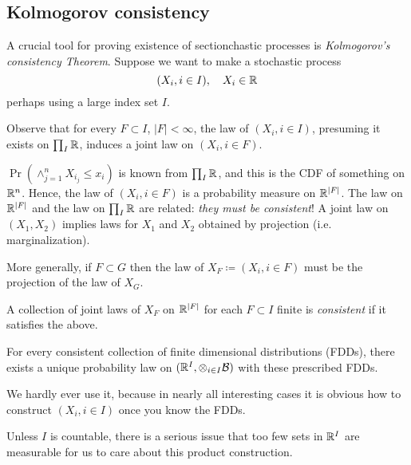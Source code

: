 
\subsection{Kolmogorov consistency}

A crucial tool for proving existence of sectionchastic processes is
\emph{Kolmogorov's consistency Theorem}.
Suppose we want to make a stochastic process
\[
  (X_i, i \in I), \quad X_i \in \mathbb{R}
\]
perhaps using a large index set $I$.

Observe that for every $F \subset I$, $\lvert F \rvert < \infty$,
the law of $(X_i, i \in I)$, presuming it exists on $\prod_{I} \mathbb{R}$,
induces a joint law on $(X_i, i \in F)$.

$\Pr(\land_{j=1}^n X_{i_j} \leq x_i)$ is known from $\prod_I \mathbb{R}$, and this
is the CDF of something on $\mathbb{R}^n$. Hence, the law of $(X_i, i \in F)$ is
a probability measure on $\mathbb{R}^{\lvert F \rvert}$.
The law on $\mathbb{R}^{\lvert F \rvert}$ and the law on $\prod_I \mathbb{R}$ are related:
\emph{they must be consistent}! A joint law on $(X_1, X_2)$ implies
laws for $X_1$ and $X_2$ obtained by projection (i.e. marginalization).

More generally, if $F \subset G$ then the law of $X_F \coloneqq (X_i, i \in F)$
must be the projection of the law of $X_G$.

\begin{definition}
  A collection of joint laws of $X_F$ on $\mathbb{R}^{\lvert F \rvert}$ for each
  $F \subset I$ finite is \emph{consistent} if it satisfies the above.
\end{definition}

\begin{theorem}[Kolmogorov]
  For every consistent collection of finite dimensional distributions (FDDs),
  there exists a unique probability law on $(\mathbb{R}^I, \otimes_{i \in I} \mathcal{B})$ with these
  prescribed FDDs.
\end{theorem}

\begin{remark}
  We hardly ever use it, because in nearly all interesting cases it is obvious
  how to construct $(X_i, i \in I)$ once you know the FDDs.
\end{remark}

\begin{remark}
  Unless $I$ is countable, there is a serious issue that too few sets in
  $\mathbb{R}^I$ are measurable for us to care about this product construction.
\end{remark}


